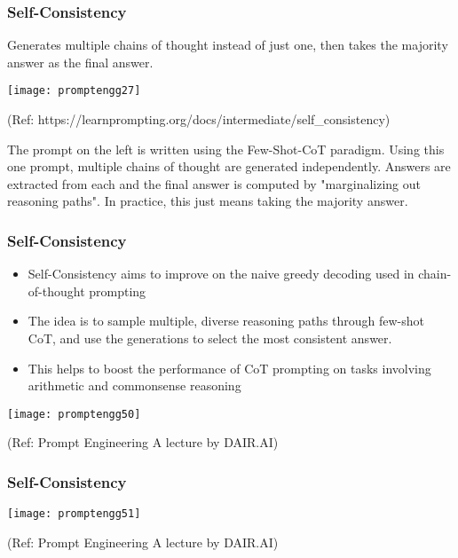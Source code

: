 \begin{frame}[fragile]\frametitle{Self-Consistency}

Generates multiple chains of thought instead of just one, then takes the majority answer as the final answer.

\begin{center}
\texttt{[image: promptengg27]}

{\tiny (Ref: https://learnprompting.org/docs/intermediate/self\_consistency)}

\end{center}		

The prompt on the left is written using the Few-Shot-CoT paradigm. Using this one prompt, multiple chains of thought are generated independently. Answers are extracted from each and the final answer is computed by "marginalizing out reasoning paths". In practice, this just means taking the majority answer.

\end{frame}

\begin{frame}[fragile]\frametitle{Self-Consistency}

\begin{itemize}
\item Self-Consistency aims to improve on the naive greedy 
decoding used in chain-of-thought prompting 
\item The idea is to sample multiple, diverse reasoning paths 
through few-shot CoT, and use the generations to select 
the most consistent answer.  
\item  This helps to boost the performance of CoT prompting on 
tasks involving arithmetic and commonsense reasoning
\end{itemize}	

\begin{center}
\texttt{[image: promptengg50]}

{\tiny (Ref: Prompt Engineering A lecture by DAIR.AI)}

\end{center}	

\end{frame}


\begin{frame}[fragile]\frametitle{Self-Consistency}

\begin{center}
\texttt{[image: promptengg51]}

{\tiny (Ref: Prompt Engineering A lecture by DAIR.AI)}

\end{center}	

\end{frame}

